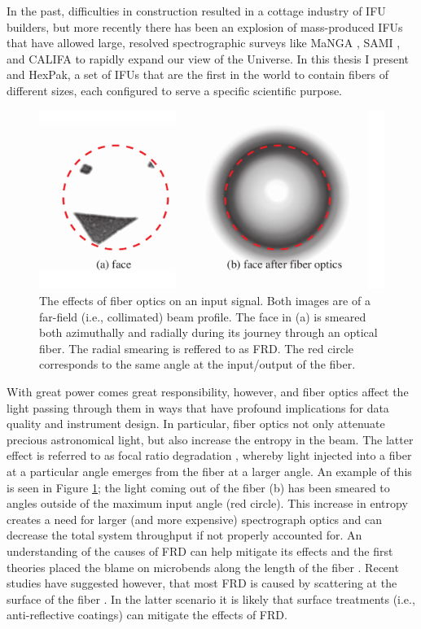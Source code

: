 In the past, difficulties in construction resulted in a cottage
industry of IFU builders, but more recently there has been an
explosion of mass-produced IFUs that have allowed large, resolved
spectrographic surveys like MaNGA \citep{Bundy15}, SAMI
\citep{Croom12}, and CALIFA \citep{Sanchez12} to rapidly expand our
view of the Universe. In this thesis I present \GP and HexPak, a set
of IFUs that are the first in the world to contain fibers of different
sizes, each configured to serve a specific scientific purpose.

\begin{figure}
  \centering
  \includegraphics[width=\textwidth]{Introduction/figs/FRDude.pdf}
  \caption[Face on FRD]{\fixspacing\label{intro:fig:FRDude}The effects
    of fiber optics on an input signal. Both images are of a far-field
    (i.e., collimated) beam profile. The face in (a) is smeared both
    azimuthally and radially during its journey through an optical
    fiber. The radial smearing is reffered to as FRD. The red circle
    corresponds to the same angle at the input/output of the fiber.}
\end{figure}

With great power comes great responsibility, however, and fiber optics
affect the light passing through them in ways that have profound
implications for data quality and instrument design. In particular,
fiber optics not only attenuate precious astronomical light, but also
increase the entropy in the beam. The latter effect is referred to as
focal ratio degradation \citep[FRD, see, e.g., ][]{Ramsey88}, whereby
light injected into a fiber at a particular angle emerges from the
fiber at a larger angle. An example of this is seen in Figure
\ref{intro:fig:FRDude}; the light coming out of the fiber (b) has been
smeared to angles outside of the maximum input angle (red
circle). This increase in entropy creates a need for larger (and more
expensive) spectrograph optics and can decrease the total system
throughput if not properly accounted for. An understanding of the
causes of FRD can help mitigate its effects and the first theories
placed the blame on microbends along the length of the fiber
\citep{Gloge72,Carrasco94}. Recent studies have suggested however,
that most FRD is caused by scattering at the surface of the fiber
\citep{Avila98,Haynes11,Eigenbrot12}. In the latter scenario it is
likely that surface treatments (i.e., anti-reflective coatings) can
mitigate the effects of FRD.

\clearpage
{} %



